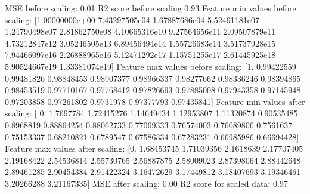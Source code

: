 \documentclass[letterpaper,10pt,english]{sphinxmanual}
\begin{document}
\begin{sphinxVerbatim}[commandchars=\\\{\}]
  
 

 
\end{sphinxVerbatim}

\begin{sphinxVerbatim}[commandchars=\\\{\}]
MSE before scaling: 0.01
R2 score before scaling 0.93
Feature min values before scaling:
 [1.00000000e+00 7.43297505e\PYGZhy{}04 1.67887686e\PYGZhy{}04 5.52491181e\PYGZhy{}07
 1.24790498e\PYGZhy{}07 2.81862750e\PYGZhy{}08 4.10665316e\PYGZhy{}10 9.27564656e\PYGZhy{}11
 2.09507879e\PYGZhy{}11 4.73212847e\PYGZhy{}12 3.05246505e\PYGZhy{}13 6.89456494e\PYGZhy{}14
 1.55726683e\PYGZhy{}14 3.51737928e\PYGZhy{}15 7.94466097e\PYGZhy{}16 2.26888965e\PYGZhy{}16
 5.12471292e\PYGZhy{}17 1.15751255e\PYGZhy{}17 2.61445925e\PYGZhy{}18 5.90524667e\PYGZhy{}19
 1.33381074e\PYGZhy{}19]
Feature max values before scaling:
 [1.         0.99422559 0.99481826 0.98848453 0.98907377 0.98966337
 0.98277662 0.98336246 0.98394865 0.98453519 0.97710167 0.97768412
 0.97826693 0.97885008 0.97943358 0.97145948 0.97203858 0.97261802
 0.9731978  0.97377793 0.97435841]
Feature min values after scaling:
 [ 0.         \PYGZhy{}1.7697784  \PYGZhy{}1.72415276 \PYGZhy{}1.14649434 \PYGZhy{}1.12953807 \PYGZhy{}1.11320874
 \PYGZhy{}0.90535485 \PYGZhy{}0.8968819  \PYGZhy{}0.88864254 \PYGZhy{}0.88062733 \PYGZhy{}0.77069333 \PYGZhy{}0.76574003
 \PYGZhy{}0.76089806 \PYGZhy{}0.7561637  \PYGZhy{}0.75153337 \PYGZhy{}0.68210821 \PYGZhy{}0.6789547  \PYGZhy{}0.67586334
 \PYGZhy{}0.67283231 \PYGZhy{}0.66985986 \PYGZhy{}0.66694428]
Feature max values after scaling:
 [0.         1.68453745 1.71039356 2.1618639  2.17707405 2.19168422
 2.54536814 2.55730765 2.56887875 2.58009023 2.87398064 2.88442648
 2.89461285 2.90454384 2.91422324 3.16472629 3.17449812 3.18407693
 3.19346461 3.20266288 3.21167335]
MSE after  scaling: 0.00
R2 score for  scaled data: 0.97
\end{sphinxVerbatim}
\end{document}
